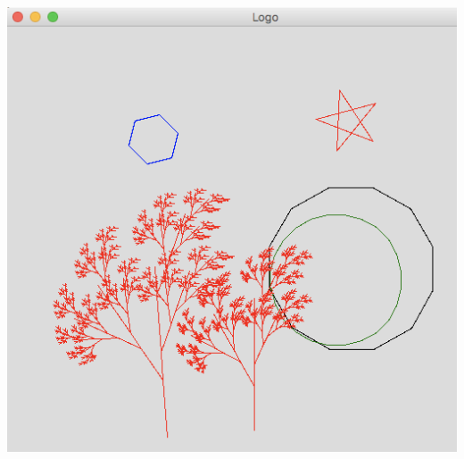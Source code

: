 \documentclass[rgb]{beamer}
\begin{document}
\begin{frame}[fragile]
\begin{footnotesize}
\begin{minipage}[b]{0.3\textwidth}
  \includegraphics[width=\textwidth]{../images/turtle.png}

\end{minipage}

\end{footnotesize}
\end{frame}
\end{document}
